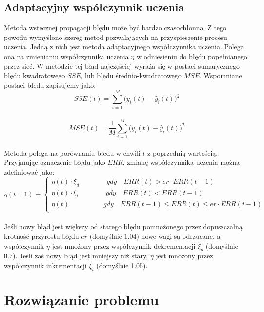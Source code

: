 \documentclass[a4paper, openright, twoside,11pt]{article}
\begin{document}
    \subsection{Adaptacyjny współczynnik uczenia}
    Metoda wstecznej propagacji błędu może być bardzo czasochłonna. Z tego powodu wymyślono szereg metod pozwalających na przyspieszenie procesu uczenia. Jedną z nich jest metoda adaptacyjnego współczynnika uczenia. Polega ona na zmienianiu współczynnika uczenia $\eta$ w odniesieniu do błędu popełnianego przez sieć. W metodzie tej błąd najczęściej wyraża się w postaci sumarycznego błędu kwadratowego $SSE$, lub błędu średnio-kwadratowego $MSE$. Wspomniane postaci błędu zapisujemy jako: \\[0.2cm]
    \begin{equation}
        SSE(t)=\sum_{i=1}^M\bigg(y_i(t)-\hat{y}_i(t)\bigg)^2
    \end{equation}\\[0.1cm]
    \begin{equation}
         MSE(t)=\frac{1}{M}\sum_{i=1}^M\bigg(y_i(t)-\hat{y}_i(t)\bigg)^2
    \end{equation}\\[0.2cm]
    Metoda polega na porównaniu błedu w chwili $t$ z poprzednią wartością. Przyjmując oznaczenie błędu jako $ERR$, zmianę współczynnika uczenia można zdefiniować jako:
    \begin{equation}
        \eta(t+1)=\begin{cases}
            \eta(t) \cdot\xi _d \qquad \qquad gdy\quad ERR(t)>er\cdot ERR(t-1)\\
            \eta(t) \cdot\xi _i \qquad \qquad gdy\quad ERR(t)<ERR(t-1)\\
            \eta(t) \qquad \quad \qquad gdy\quad ERR(t-1) \leq ERR(t)\leq er\cdot ERR(t-1)\\
        \end{cases}
    \end{equation}\\[0.2cm]
    Jeśli nowy błąd jest większy od starego błędu pomnożonego przez dopuszczalną krotność przyrostu błędu $er$ (domyślnie 1.04) nowe wagi są odrzucane, a współczynnik $\eta$ jest mnożony przez współczynnik dekrementacji $\xi _d$ (domyślnie 0.7). Jeśli zaś nowy błąd jest mniejszy niż stary, $\eta$ jest mnożony przez współczynnik inkrementacji $\xi _i$ (domyślnie 1.05).
   \clearpage
    
    
    \section{Rozwiązanie problemu}
\end{document}
